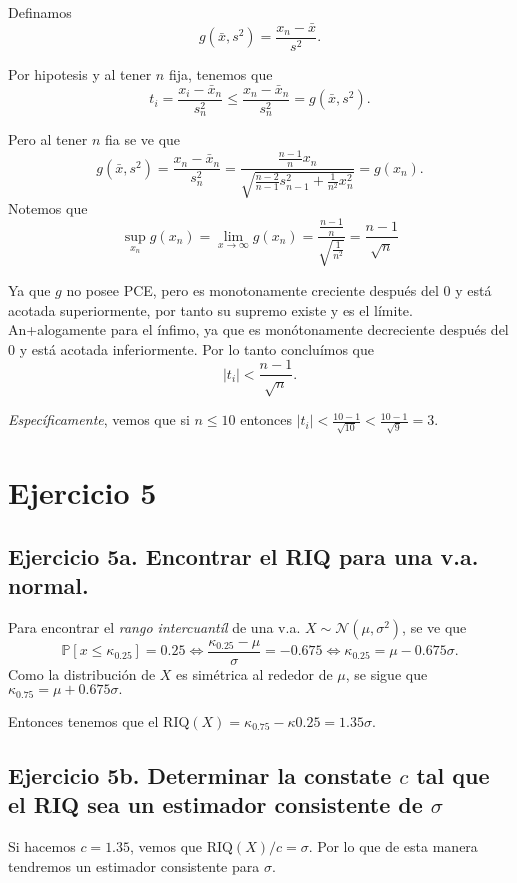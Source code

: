 \documentclass[]{article}
\begin{document}
Definamos \[g(\bar{x},s^{2}) = \frac{x_{n}-\bar{x}}{s^{2}}.\]

Por hipotesis y al tener \(n\) fija, tenemos que
\[t_{i} = \frac{x_{i}-\bar{x}_{n}}{s_{n}^{2}} \leq \frac{x_{n}-\bar{x}_{n}}{s^{2}_{n}} = g(\bar{x},s^{2}).\]

Pero al tener \(n\) fia se ve que
\[g(\bar{x},s^{2}) = \frac{x_{n}-\bar{x}_{n}}{s^{2}_{n}} = \frac{\frac{n-1}{n}x_{n}}{\sqrt{\frac{n-2}{n-1}s^{2}_{n-1} + \frac{1}{n^{2}}x_{n}^{2}}} = g(x_{n}).\]
Notemos que
\[\sup_{x_{n}}{g(x_{n})} = \lim_{x \to \infty }{g(x_{n})} = \frac{\frac{n-1}{n}}{\sqrt{\frac{1}{n^{2}}}} = \frac{n-1}{\sqrt{n}}\]

Ya que \(g\) no posee PCE, pero es monotonamente creciente después del
\(0\) y está acotada superiormente, por tanto su supremo existe y es el
límite. An+alogamente para el ínfimo, ya que es monótonamente
decreciente después del \(0\) y está acotada inferiormente. Por lo tanto
concluímos que \[ |t_{i}| < \frac{n-1}{\sqrt{n}}.\]

\emph{Específicamente}, vemos que si \(n \leq 10\) entonces
\(|t_{i}| < \frac{10-1}{\sqrt{10}} < \frac{10-1}{\sqrt{9}} = 3.\)

\hypertarget{ejercicio-5}{%
\section{Ejercicio 5}\label{ejercicio-5}}

\hypertarget{ejercicio-5a.-encontrar-el-riq-para-una-v.a.-normal.}{%
\subsection{Ejercicio 5a. Encontrar el RIQ para una v.a.
normal.}\label{ejercicio-5a.-encontrar-el-riq-para-una-v.a.-normal.}}

Para encontrar el \emph{rango intercuantíl} de una v.a.
\(X \sim \mathcal{N}(\mu,\sigma^{2})\), se ve que
\[ \mathbb{P}[x \leq \kappa_{0.25}] = 0.25 \iff \frac{\kappa_{0.25} - \mu}{\sigma} = -0.675 \iff \kappa_{0.25} = \mu - 0.675 \sigma.\]
Como la distribución de \(X\) es simétrica al rededor de \(\mu\), se
sigue que \(\kappa_{0.75} = \mu + 0.675\sigma.\)

Entonces tenemos que el
\(\text{RIQ}(X) = \kappa_{0.75} - \kappa{0.25} = 1.35 \sigma.\)

\hypertarget{ejercicio-5b.-determinar-la-constate-c-tal-que-el-riq-sea-un-estimador-consistente-de-sigma}{%
\subsection{\texorpdfstring{Ejercicio 5b. Determinar la constate \(c\)
tal que el RIQ sea un estimador consistente de
\(\sigma\)}{Ejercicio 5b. Determinar la constate c tal que el RIQ sea un estimador consistente de \textbackslash sigma}}\label{ejercicio-5b.-determinar-la-constate-c-tal-que-el-riq-sea-un-estimador-consistente-de-sigma}}

Si hacemos \(c = 1.35\), vemos que \(\text{RIQ}(X)/c = \sigma.\) Por lo
que de esta manera tendremos un estimador consistente para \(\sigma\).
\end{document}
